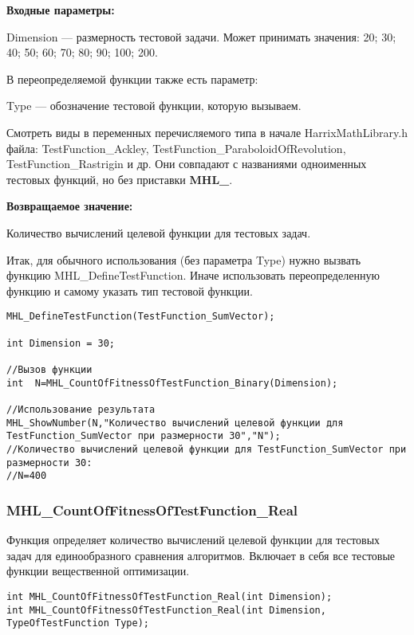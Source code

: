 \documentclass[a4paper,12pt]{article}
\begin{document}
\textbf{Входные параметры:}

Dimension --- размерность тестовой задачи. Может принимать значения: 20; 30; 40; 50; 60; 70; 80; 90; 100; 200.

В переопределяемой функции также есть параметр:
  
Type --- обозначение тестовой функции, которую вызываем. 

Смотреть виды в переменных перечисляемого типа в начале HarrixMathLibrary.h файла: TestFunction\_Ackley, TestFunction\_ParaboloidOfRevolution, TestFunction\_Rastrigin и др. Они совпадают с названиями одноименных тестовых функций, но без приставки \textbf{MHL\_}.

\textbf{Возвращаемое значение:}
 
Количество вычислений целевой функции для тестовых задач.

Итак, для обычного использования (без параметра Type) нужно вызвать функцию MHL\_DefineTestFunction. Иначе использовать переопределенную функцию и самому указать тип тестовой функции.


\begin{lstlisting}[label=code_use_MHL_CountOfFitnessOfTestFunction_Binary,caption=Пример использования]
MHL_DefineTestFunction(TestFunction_SumVector);

int Dimension = 30;

//Вызов функции
int  N=MHL_CountOfFitnessOfTestFunction_Binary(Dimension);

//Использование результата
MHL_ShowNumber(N,"Количество вычислений целевой функции для TestFunction_SumVector при размерности 30","N");
//Количество вычислений целевой функции для TestFunction_SumVector при размерности 30:
//N=400
\end{lstlisting}

\subsubsection{MHL\_CountOfFitnessOfTestFunction\_Real}\label{MHL_CountOfFitnessOfTestFunction_Real}

Функция определяет количество вычислений целевой функции для тестовых задач для единообразного сравнения алгоритмов. Включает в себя все тестовые функции вещественной оптимизации.


\begin{lstlisting}[label=code_syntax_MHL_CountOfFitnessOfTestFunction_Real,caption=Синтаксис]
int MHL_CountOfFitnessOfTestFunction_Real(int Dimension);
int MHL_CountOfFitnessOfTestFunction_Real(int Dimension, TypeOfTestFunction Type);
\end{lstlisting}
\end{document}
